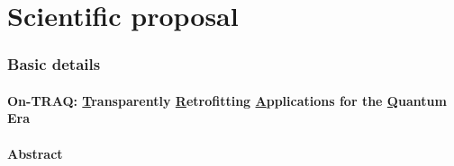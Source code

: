 \documentclass[a4paper,10pt,fleqn]{application}
\begin{document}




\part{Scientific proposal}

\section{Basic details}
\vspace{\baselineskip}

\subsection{On-TRAQ: \underline{T}ransparently \underline{R}etrofitting \underline{A}pplications for the \underline{Q}uantum Era}


\subsection{Abstract}
\end{document}
